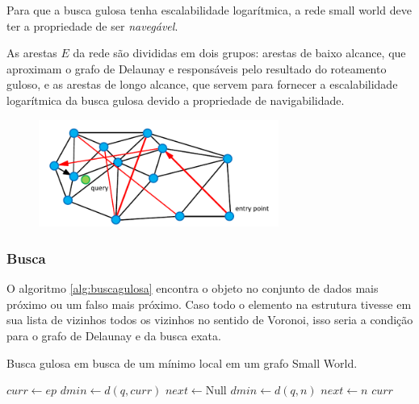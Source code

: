 Para que a busca gulosa tenha escalabilidade logarítmica, a rede small world deve ter a propriedade de ser \textit{navegável}.\cite{smallworld:kleinberg2000}

As arestas $E$ da rede são divididas em dois grupos: arestas de baixo alcance, que aproximam o grafo de Delaunay e responsáveis pelo resultado do roteamento guloso, e as arestas de longo alcance, que servem para fornecer a escalabilidade logarítmica da busca gulosa devido a propriedade de navigabilidade.

\begin{figure}
    \centering
    \includegraphics[width=0.7\textwidth]{imgs/navigablesmallworld_graph.png}
    \label{fig:navsmallworld}
\end{figure}

\subsubsection{Busca}

O algoritmo \cref{alg:buscagulosa} encontra o objeto no conjunto de dados mais próximo ou um falso mais próximo. Caso todo o elemento na estrutura tivesse em sua lista de vizinhos todos os vizinhos no sentido de Voronoi, isso seria a condição para o grafo de Delaunay e da busca exata.

\begin{algorithm}
\caption{Busca gulosa em busca de um mínimo local em um grafo Small World.}
\label{alg:buscagulosa}
\begin{algorithmic}[1]
    \State $curr \gets ep$
    \State $dmin \gets d(q, curr)$
    \State $next \gets \text{Null}$
            \State $dmin \gets d(q, n)$
            \State $next \gets n$
        \EndIf
    \EndFor
        \State \Return $curr$ 
    \Else
        \State \Return {}
    \EndIf
\EndProcedure
\end{algorithmic}
\end{algorithm}

